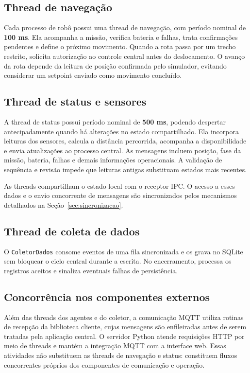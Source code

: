 \documentclass[12pt,a4paper]{article}
\newcommand{\code}[1]{\mbox{\texttt{#1}}}
\begin{document}
\subsection{Thread de navegação}
Cada processo de robô possui uma thread de navegação, com período nominal de
\textbf{100 ms}. Ela acompanha a missão, verifica bateria e falhas, trata
confirmações pendentes e define o próximo movimento. Quando a rota passa por um
trecho restrito, solicita autorização ao controle central antes do
deslocamento. O avanço da rota depende da leitura de posição confirmada pelo
simulador, evitando considerar um setpoint enviado como movimento concluído.

\subsection{Thread de status e sensores}
A thread de status possui período nominal de \textbf{500 ms}, podendo despertar
antecipadamente quando há alterações no estado compartilhado. Ela incorpora
leituras dos sensores, calcula a distância percorrida, acompanha a
disponibilidade e envia atualizações ao processo central. As mensagens incluem
posição, fase da missão, bateria, falhas e demais informações operacionais. A
validação de sequência e revisão impede que leituras antigas substituam estados
mais recentes.

As threads compartilham o estado local com o receptor IPC. O acesso a esses
dados e o envio concorrente de mensagens são sincronizados pelos mecanismos
detalhados na Seção~\ref{sec:sincronizacao}.

\subsection{Thread de coleta de dados}
O \code{ColetorDados} consome eventos de uma fila sincronizada e os grava no
SQLite sem bloquear o ciclo central durante a escrita. No encerramento,
processa os registros aceitos e sinaliza eventuais falhas de persistência.

\subsection{Concorrência nos componentes externos}
Além das threads dos agentes e do coletor, a comunicação MQTT utiliza rotinas
de recepção da biblioteca cliente, cujas mensagens são enfileiradas antes de
serem tratadas pela aplicação central. O servidor Python atende requisições
HTTP por meio de threads e mantém a integração MQTT com a interface web. Essas
atividades não substituem as threads de navegação e status: constituem fluxos
concorrentes próprios dos componentes de comunicação e operação.
\end{document}
